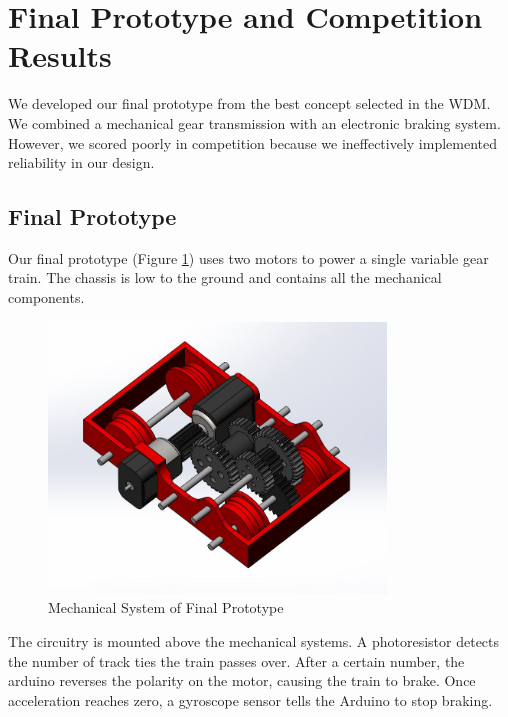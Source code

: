 \documentclass[class=../report, crop=false]{standalone}
\begin{document}
\section{Final Prototype and Competition Results}

We developed our final prototype from the best concept selected in the WDM.
We combined a mechanical gear transmission with an electronic braking system.
However, we scored poorly in competition because we ineffectively implemented reliability in our design.

\subsection{Final Prototype}

Our final prototype (Figure \ref{fig:finalmech}) uses two motors to power a single variable gear train.
The chassis is low to the ground and contains all the mechanical components. 

\begin{figure}[H]
	\centering
	\includegraphics[width=0.8\textwidth]{../res/img/finalmech}
	\caption{Mechanical System of Final Prototype}
	\label{fig:finalmech}
\end{figure}

\clearpage

The circuitry is mounted above the mechanical systems\footnotemark.
A photoresistor detects the number of track ties the train passes over.
After a certain number, the arduino reverses the polarity on the motor, causing the train to brake.
Once acceleration reaches zero, a gyroscope sensor tells the Arduino to stop braking.
\end{document}

